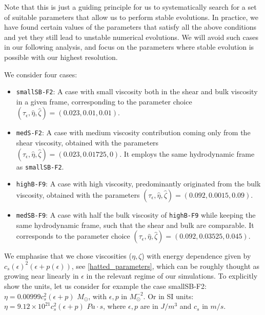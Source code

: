 \documentclass[prd,aps,twocolumn,floats,floatfix,nofootinbib,superscriptaddress] {revtex4-1}
\begin{document}
Note that this is just a guiding principle for us to systematically search for a set of suitable parameters that allow us to perform stable evolutions. In practice, we have found certain values of the parameters that satisfy all the above conditions and yet they still lead to unstable  numerical evolutions.
We will avoid such cases in our following analysis, and focus on the parameters where stable evolution is possible with our highest resolution. 

We consider four cases:
\begin{itemize}
    \item \texttt{smallSB-F2}: A case with small viscosity both in the shear and bulk viscosity in a given frame, corresponding to the parameter choice $(\tau_\epsilon, \hat{\eta} 
    , \hat{\zeta} 
    ) = (0.023,0.01,0.01)$.
    \item \texttt{medS-F2}: A case with medium viscosity contribution coming only from the shear viscosity, obtained with the parameters $(\tau_\epsilon, \hat{\eta}
    , \hat{\zeta}
    ) = (0.023, 0.01725, 0)$. It employs the same hydrodynamic frame as \texttt{smallSB-F2}.
    \item \texttt{highB-F9}: A case with high viscosity, predominantly originated from the bulk viscosity, obtained with the parameters $(\tau_\epsilon, \hat{\eta} 
    , \hat{\zeta} 
    ) = (0.092, 0.0015,0.09)$.
    \item  \texttt{medSB-F9}: A case with half the bulk viscosity of \texttt{highB-F9} while keeping the same hydrodynamic frame, such that the shear and bulk are comparable. It corresponds to the parameter choice $(\tau_\epsilon, \hat{\eta} 
    , \hat{\zeta} 
    ) = (0.092, 0.03525,0.045)$.
\end{itemize}

We emphasise that we chose viscosities ($\eta,\zeta$) with energy dependence given by $c_s(\epsilon)^2(\epsilon+p(\epsilon))$, see \eqref{hatted_parameters}, which can be roughly thought as growing near linearly in $\epsilon$ in the relevant regime of our simulations. 
To explicitly show the units, let us consider for example the case smallSB-F2: $\eta=0.00999 c_{s}^{2}(\epsilon+p)$ $M_{\odot}$, with $\epsilon,p$ in $M_{\odot}^{-2}$. Or in SI units: $\eta=9.12\times10^{21} c_{s}^{2}(\epsilon+p)$ $Pa \cdot s$, where $\epsilon,p$ are in $J/m^3$ and $c_s$ in $m/s$. 

\end{document}
